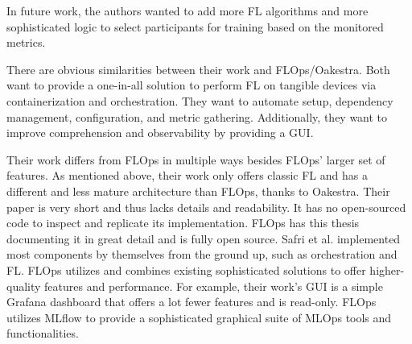 In future work, the authors wanted to add more FL algorithms and more sophisticated logic to select participants for training based on the monitored metrics.

There are obvious similarities between their work and FLOps/Oakestra.
Both want to provide a one-in-all solution to perform FL on tangible devices via containerization and orchestration.
They want to automate setup, dependency management, configuration, and metric gathering.
Additionally, they want to improve comprehension and observability by providing a GUI.

Their work differs from FLOps in multiple ways besides FLOps' larger set of features.
As mentioned above, their work only offers classic FL and has a different and less mature architecture than FLOps, thanks to Oakestra.
Their paper is very short and thus lacks details and readability.
It has no open-sourced code to inspect and replicate its implementation.
FLOps has this thesis documenting it in great detail and is fully open source.
Safri et al. implemented most components by themselves from the ground up, such as orchestration and FL.
FLOps utilizes and combines existing sophisticated solutions to offer higher-quality features and performance.
For example, their work's GUI is a simple Grafana dashboard that offers a lot fewer features and is read-only.
FLOps utilizes MLflow to provide a sophisticated graphical suite of MLOps tools and functionalities.
